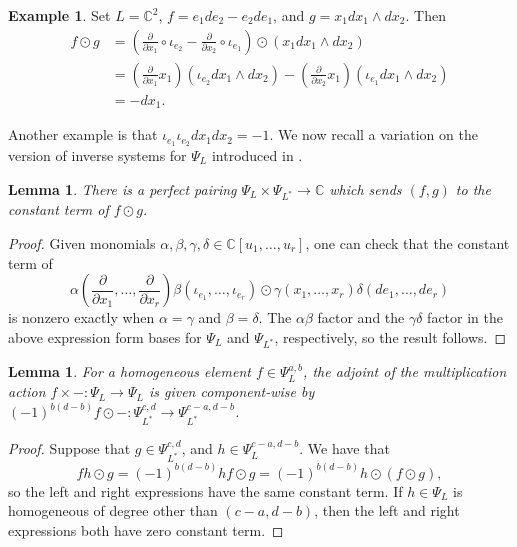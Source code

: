 \documentclass{amsart}
\newtheorem{lemma}[theorem]{Lemma}
\newcommand{\F}{\mathbb{C}}
\newcommand{\C}{\mathbb{C}}
\theoremstyle{definition}
\newtheorem{example}[theorem]{Example}
\begin{document}
\begin{example}
    Set $L = \F^2$, $f = e_1de_2 - e_2de_1$, and $g = x_1dx_1\wedge dx_2$. Then
    \begin{align*}
        f\odot g &= (\frac{\partial}{\partial x_1} \circ 
        \iota_{e_2} - \frac{\partial}{\partial x_2}\circ 
        \iota_{e_1}) \odot (x_1dx_1\wedge dx_2)\\
                 &= (\frac{\partial}{\partial x_1} 
                 x_1)(\iota_{e_2} dx_1\wedge dx_2) - (\frac{\partial}{\partial x_2} 
                 x_1)(\iota_{e_1} dx_1 \wedge dx_2)\\
                 &= -dx_1.
        \end{align*}
\end{example}
Another example is that $\iota_{e_1} \iota_{e_2} dx_1 dx_2 = -1$. We now recall a variation on the version of inverse systems for $\Psi_L$ introduced in \cite[Section 2]{Superspace}. 

\begin{lemma}
    There is a perfect pairing $\Psi_L \times \Psi_{L^*} \to 
    \F$ which sends $(f,g)$ to the constant term of $f\odot g$.
\end{lemma}
\begin{proof}
    Given monomials $\alpha,\beta,\gamma,\delta \in \C[u_1, \ldots, 
    u_r]$, one can check that the constant term of 
    \[
        \alpha(\frac{\partial}{\partial x_1}, \ldots, \frac{\partial}{\partial 
        x_r}) \beta(\iota_{e_1}, \ldots, \iota_{e_r}) \odot 
        \gamma(x_1, \ldots, x_r)\delta(de_1, \ldots, de_r)
    \]
    is nonzero exactly when $\alpha=\gamma$ and $\beta=\delta$.
    The $\alpha\beta$ factor and the $\gamma\delta$ factor in the above 
    expression form bases for $\Psi_L$ and $\Psi_{L^*}$, respectively, so 
    the result follows.
\end{proof}

\begin{lemma}\label{mult-adjoint}
    For a homogeneous element $f \in \Psi_L^{a,b}$, the adjoint of the multiplication action $f \times -:\Psi_L \to \Psi_L$ is given 
    component-wise by $(-1)^{b(d-b)} f \odot -:\Psi_{L^*}^{c,d} \to 
    \Psi_{L^*}^{c-a,d-b}$.
\end{lemma}
\begin{proof}
    Suppose that $g \in \Psi_{L^*}^{c,d}$, and $h \in \Psi_{L}^{c-a,d-b}$. 
    We have that
    \[
        fh \odot g = (-1)^{b(d-b)}hf\odot g = (-1)^{b(d-b)}h \odot (f \odot g),
    \]
    so the left and right expressions have the same 
    constant term. If $h \in \Psi_{L}$ is homogeneous of degree other 
    than $(c-a,d-b)$, then the left and right expressions both have zero constant term.
\end{proof}
\end{document}
